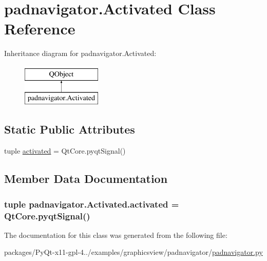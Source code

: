 \hypertarget{classpadnavigator_1_1Activated}{}\section{padnavigator.\+Activated Class Reference}
\label{classpadnavigator_1_1Activated}
Inheritance diagram for padnavigator.\+Activated\+:\begin{figure}[H]
\begin{center}
\leavevmode
\includegraphics[height=2.000000cm]{classpadnavigator_1_1Activated}
\end{center}
\end{figure}
\subsection*{Static Public Attributes}
\begin{DoxyCompactItemize}
\item 
tuple \hyperlink{classpadnavigator_1_1Activated_a37dbec05846237ba5eda76825fa3ee50}{activated} = Qt\+Core.\+pyqt\+Signal()
\end{DoxyCompactItemize}


\subsection{Member Data Documentation}
\hypertarget{classpadnavigator_1_1Activated_a37dbec05846237ba5eda76825fa3ee50}{}
\subsubsection[{activated}]{\setlength{\rightskip}{0pt plus 5cm}tuple padnavigator.\+Activated.\+activated = Qt\+Core.\+pyqt\+Signal()\hspace{0.3cm}{\ttfamily [static]}}\label{classpadnavigator_1_1Activated_a37dbec05846237ba5eda76825fa3ee50}


The documentation for this class was generated from the following file\+:\begin{DoxyCompactItemize}
\item 
packages/\+Py\+Qt-\/x11-\/gpl-\/4../examples/graphicsview/padnavigator/\hyperlink{padnavigator_8py}{padnavigator.\+py}\end{DoxyCompactItemize}
